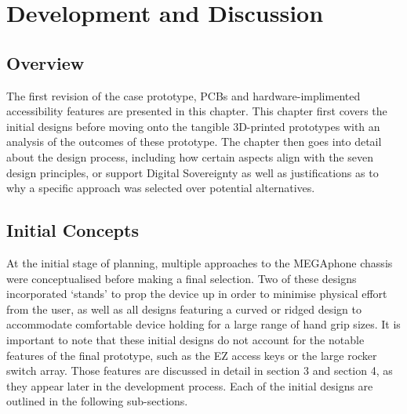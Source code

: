 
\chapter{Development and Discussion} %

\label{Chapter4} %


\section{Overview}

The first revision of the case prototype, PCBs and hardware-implimented accessibility features are presented in this chapter.
This chapter first covers the initial designs before moving onto the tangible 3D-printed prototypes with an analysis of the outcomes of these prototype.
The chapter then goes into detail about the design process, including how certain aspects align with the seven design principles, or support Digital Sovereignty as well as justifications as to why a specific approach was selected over potential alternatives.


\section{Initial Concepts}

At the initial stage of planning, multiple approaches to the MEGAphone chassis were conceptualised before making a final selection. 
Two of these designs incorporated ‘stands’ to prop the device up in order to minimise physical effort from the user, as well as all designs featuring a curved or ridged design to accommodate comfortable device holding for a large range of hand grip sizes. 
It is important to note that these initial designs do not account for the notable features of the final prototype, such as the EZ access keys or the large rocker switch array.
Those features are discussed in detail in section 3 and section 4, as they appear later in the development process.
Each of the initial designs are outlined in the following sub-sections.

